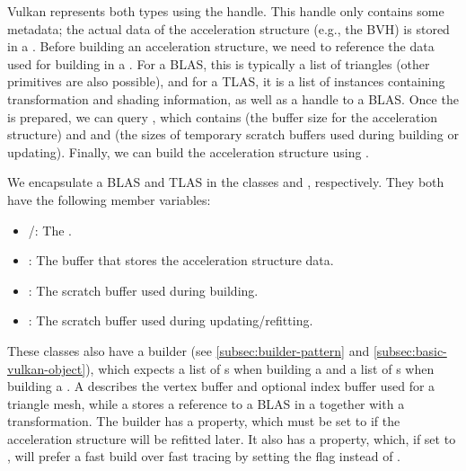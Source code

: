 Vulkan represents both types using the  handle. This handle only contains some metadata; the actual data of the acceleration structure (e.g., the BVH) is stored in a . Before building an acceleration structure, we need to reference the data used for building in a . For a BLAS, this is typically a list of triangles (other primitives are also possible), and for a TLAS, it is a list of instances containing transformation and shading information, as well as a handle to a BLAS. Once the  is prepared, we can query , which contains  (the buffer size for the acceleration structure) and  and  (the sizes of temporary scratch buffers used during building or updating). Finally, we can build the acceleration structure using .

We encapsulate a BLAS and TLAS in the classes  and , respectively. They both have the following member variables:

\begin{itemize}
    \item {}/: The .
    \item {}: The buffer that stores the acceleration structure data.
    \item {}: The scratch buffer used during building.
    \item {}: The scratch buffer used during updating/refitting.
\end{itemize}

These classes also have a builder (see \autoref{subsec:builder-pattern} and \autoref{subsec:basic-vulkan-object}), which expects a list of s when building a  and a list of s when building a . A  describes the vertex buffer and optional index buffer used for a triangle mesh, while a  stores a reference to a BLAS in a  together with a transformation. The builder has a  property, which must be set to  if the acceleration structure will be refitted later. It also has a  property, which, if set to , will prefer a fast build over fast tracing by setting the flag  instead of .

